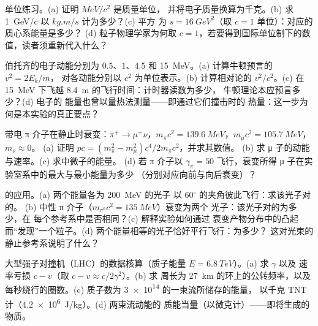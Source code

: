 \begin{exercise}[$\star$]\label{exo:b3:relativistic-dynamics:4}
单位练习。(a) 证明 $\unit{MeV}/c^2$ 是质量单位，
并将电子质量换算为千克。(b) 求
\qty{1}{GeV/c} 以 $\unit{kg.m/s}$ 计为多少？(c) 平方
为 $s = \qty{16}{GeV^2}$（取 $c = 1$ 单位）：对应的质心系能量是多少？
(d) 粒子物理学家为何取
$c = 1$，若要得到国际单位制下的数值，读者须重新代入什么？
\end{exercise}

\begin{exercise}[$\star\star$]\label{exo:b3:relativistic-dynamics:5}
伯托齐的电子动能分别为 $0.5$、$1$、$4.5$ 和
\qty{15}{MeV}。(a) 计算牛顿预言的 $v^2 = 2E_k/m$，
对各动能分别以 $c^2$ 为单位表示。(b) 计算相对论的 $v^2/c^2$。(c)
在 \qty{15}{MeV} 下飞越 \qty{8.4}{m} 的飞行时间：计时器读数为多少，
牛顿理论本应预言多少？(d) 电子的
能量也曾以量热法测量——即通过它们撞击时的
热量：这一步为何是本实验的真正要点？
\end{exercise}

\begin{exercise}[$\star\star$]\label{exo:b3:relativistic-dynamics:6}
带电 π 介子在静止时衰变：$\pi^+ \to \mu^+\nu$，$m_\pi c^2 =
\qty{139.6}{MeV}$，$m_\mu c^2 = \qty{105.7}{MeV}$，$m_\nu \approx 0$。
(a) 证明 $pc = (m_\pi^2 - m_\mu^2)c^4/2m_\pi c^2$，并求其数值。
(b) 求 μ 子的动能与速率。(c) 求中微子的能量。
(d) 若 π 介子以 $\gamma_\pi = 50$ 飞行，衰变所得 μ 子在实验室系中的最大与最小能量为多少
（分别对应向前与向后衰变）？
\end{exercise}

\begin{exercise}[$\star\star$]\label{exo:b3:relativistic-dynamics:7}
的应用。(a) 两个能量各为 \qty{200}{MeV} 的光子
以 $60^\circ$ 的夹角彼此飞行：求该光子对的。
(b) 中性 π 介子（$m_{\pi^0}c^2 = \qty{135}{MeV}$）衰变为两个
光子：该光子对的为多少，在
每个参考系中是否相同？(c) 解释实验如何通过
衰变产物分布中的凸起而“发现”一个粒子。(d)
两个能量相等的光子恰好平行飞行：为多少？
这对光束的静止参考系说明了什么？
\end{exercise}

\begin{exercise}[$\star\star$]\label{exo:b3:relativistic-dynamics:8}
大型强子对撞机（LHC）的数据核算（质子能量 $E = \qty{6.8}{TeV}$）。(a) 求 $\gamma$ 以及
速率亏损 $c - v$（取 $c - v \approx c/2\gamma^2$）。(b) 求
周长为 \qty{27}{km} 的环上的公转频率，以及
每秒绕行的圈数。(c) 质子数为 \num{3e14} 的一束流所储存的能量，
以千克 TNT 计（\qty{4.2e6}{J/kg}）。(d) 两束流动能的
质能当量（以微克计）——即将生成的物质。
\end{exercise}


